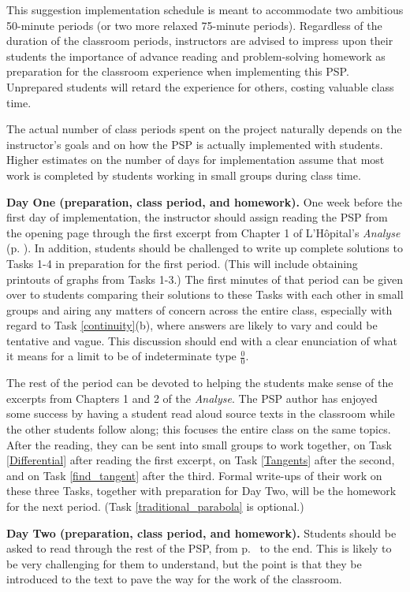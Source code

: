 \message{ !name(LHopitalsRule_2021.03.29.tex)}\documentclass[11pt]{article}
\begin{document}
This suggestion implementation schedule is meant to accommodate two ambitious 50-minute periods (or two more relaxed 75-minute periods). Regardless of the duration of the classroom periods, instructors are advised to impress upon their students the importance of advance reading and problem-solving homework as preparation for the classroom experience when implementing this PSP. Unprepared students will retard the experience for others, costing valuable class time.

The actual number of class periods spent on the project naturally  depends on the instructor's goals and on how the PSP is actually implemented with students.  Higher estimates on the number of days for implementation assume that most work is completed by students working in small groups during class time.

{\bf Day One (preparation, class period, and homework).} One week before the first day of implementation, the instructor should assign reading the PSP from the opening page through the first excerpt from Chapter 1 of L'H\^opital's \emph{Analyse} (p. \pageref{Ch1}). In addition, students should be challenged to write up complete solutions to Tasks 1-4 in preparation for the first period. (This will include obtaining printouts of graphs from Tasks 1-3.) The first minutes of that period can be given over to students comparing their solutions to these Tasks with each other in small groups and airing any matters of concern across the entire class, especially with regard to Task \ref{continuity}(b), where answers are likely to vary and could be tentative and vague. This discussion should end with a clear enunciation of what it means for a limit to be of indeterminate type $\frac00$. 

The rest of the period can be devoted to helping the students make sense of the excerpts from Chapters 1 and 2 of the \emph{Analyse}. The PSP author has enjoyed some success by having a student read aloud source texts in the classroom while the other students follow along; this focuses the entire class on the same topics. After the reading, they can be sent into small groups to work together, on Task \ref{Differential} after reading the first excerpt, on Task \ref{Tangents} after the second, and on Task \ref{find_tangent} after the third. Formal write-ups of their work on these three Tasks, together with preparation for Day Two, will be the homework for the next period. (Task \ref{traditional_parabola} is optional.)

{\bf Day Two (preparation, class period, and homework).} Students should be asked to read through the rest of the PSP, from p.~\pageref{traditional_parabola} to the end. This is likely to be very challenging for them to understand, but the point is that they be introduced to the text to pave the way for the work of the classroom. 
\end{document}

